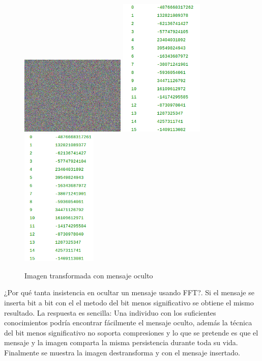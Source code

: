 \documentclass[12pt]{article}
\begin{document}
\newline
\begin{figure}[hbtp]
\centering
\includegraphics[width = 5cm]{chois2.png}
\includegraphics[width = 4cm]{selection1.png}
\includegraphics[width = 3.6cm]{selection2.png}
\caption{Imagen transformada con mensaje oculto}
\end{figure}
\newline
¿Por qué tanta insistencia en ocultar un mensaje usando FFT?. Si el mensaje se inserta bit a bit con el el metodo del bit menos significativo se obtiene el mismo resultado. La respuesta es sencilla: Una individuo con los suficientes conocimientos podría encontrar fácilmente el mensaje oculto, además la técnica del bit menos significativo no soporta compresiones y lo que se pretende es que el mensaje y la imagen comparta la misma persistencia durante toda su vida. Finalmente se muestra la imagen destransforma y con el mensaje insertado. 
\end{document}
